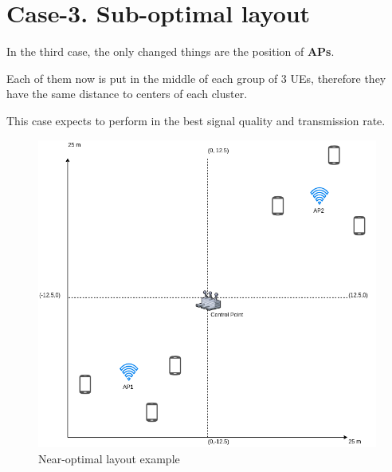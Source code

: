 \hypertarget{case-3.-sub-optimal-layout}{%
\section{Case-3. Sub-optimal
layout}\label{case-3.-near-optimal-layout}}

In the third case, the only changed things are the position of
\textbf{APs}.

Each of them now is put in the middle of each group of 3 UEs, therefore
they have the same distance to centers of each cluster.

This case expects to perform in the best signal quality and transmission rate.

\begin{figure}[H]
	\centering
	\includegraphics[width=\linewidth,keepaspectratio]{images/05-cases-description-Suboptimal.png}
\caption{Near-optimal layout example}
\end{figure}

